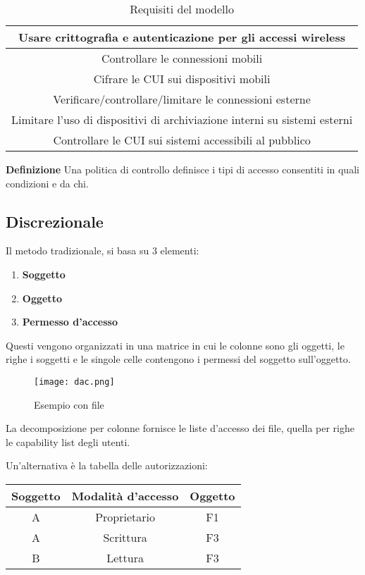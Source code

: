 \documentclass{article}
\newcommand{\df}[1]{\noindent\textbf{Definizione } #1.\newline}
\begin{document}
\begin{table}[ht]
\begin{tabular}{|c|}
        \hline
        Usare crittografia e autenticazione per gli accessi wireless\\
        \hline
        Controllare le connessioni mobili\\
        \hline
        Cifrare le CUI sui dispositivi mobili\\
        \hline
        Verificare/controllare/limitare le connessioni esterne\\
        \hline
        Limitare l'uso di dispositivi di archiviazione interni su sistemi esterni\\
        \hline
        Controllare le CUI sui sistemi accessibili al pubblico\\
        \hline
    \end{tabular}
    \caption{Requisiti del modello}
\end{table}

\df{Una politica di controllo definisce i tipi di accesso consentiti in quali condizioni e da chi}

\subsection{Discrezionale}

Il metodo tradizionale, si basa su 3 elementi:
\begin{enumerate}
    \item \textbf{Soggetto}
    \item \textbf{Oggetto}
    \item \textbf{Permesso d'accesso}
\end{enumerate}

\noindent Questi vengono organizzati in una matrice in cui le colonne sono gli oggetti, le righe i soggetti e le singole celle contengono i permessi del soggetto sull'oggetto.\newline

\begin{figure}[ht]
    \centering
    \texttt{[image: dac.png]}
    \caption{Esempio con file}
\end{figure}

\noindent La decomposizione per colonne fornisce le liste d'accesso dei file, quella per righe le capability list degli utenti.

\newpage

\noindent Un'alternativa è la tabella delle autorizzazioni:

\begin{table}[ht]
    \centering
    \begin{tabular}{c|c|c}
        Soggetto & Modalità d'accesso & Oggetto\\
        \hline
        A & Proprietario & F1\\
        \hline
        A & Scrittura & F3\\
        \hline
        B & Lettura & F3\\
    \end{tabular}
\end{table}
\end{document}

